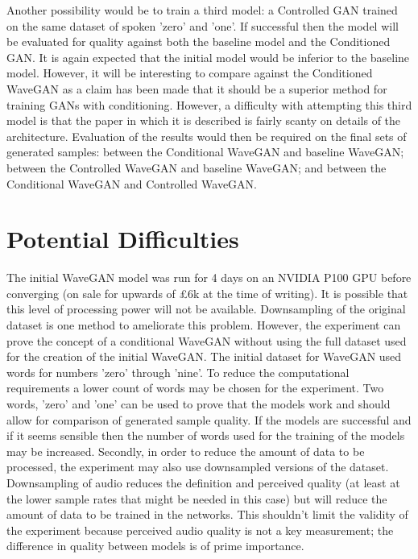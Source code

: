 \documentclass[a4paper, titlepage]{article}
\begin{document}
Another possibility would be to train a third model: a Controlled GAN trained on the same dataset of spoken 'zero' and 'one'.
If successful then the model will be evaluated for quality against both the baseline model and the Conditioned GAN.
It is again expected that the initial model would be inferior to the baseline model.
However, it will be interesting to compare against the Conditioned WaveGAN as a claim has been made that it should be a superior method for training GANs with conditioning.
However, a difficulty with attempting this third model is that the paper in which it is described is fairly scanty on details of the architecture.
\newline
\newline
Evaluation of the results would then be required on the final sets of generated samples: between the Conditional WaveGAN and baseline WaveGAN; between the Controlled WaveGAN and baseline WaveGAN; and between the Conditional WaveGAN and Controlled WaveGAN.

\section{Potential Difficulties}

The initial WaveGAN model was run for 4 days on an NVIDIA P100 GPU before converging (on sale for upwards of £6k at the time of writing).
It is possible that this level of processing power will not be available.
Downsampling of the original dataset is one method to ameliorate this problem.
\newline
\newline
However, the experiment can prove the concept of a conditional WaveGAN without using the full dataset used for the creation of the initial WaveGAN.
The initial dataset for WaveGAN used words for numbers 'zero' through 'nine'.
To reduce the computational requirements a lower count of words may be chosen for the experiment.
Two words, 'zero' and 'one' can be used to prove that the models work and should allow for comparison of generated sample quality.
If the models are successful and if it seems sensible then the number of words used for the training of the models may be increased.
\newline
\newline
Secondly, in order to reduce the amount of data to be processed, the experiment may also use downsampled versions of the dataset.
Downsampling of audio reduces the definition and perceived quality (at least at the lower sample rates that might be needed in this case) but will reduce the amount of data to be trained in the networks.
This shouldn't limit the validity of the experiment because perceived audio quality is not a key measurement; the difference in quality between models is of prime importance.
\end{document}
